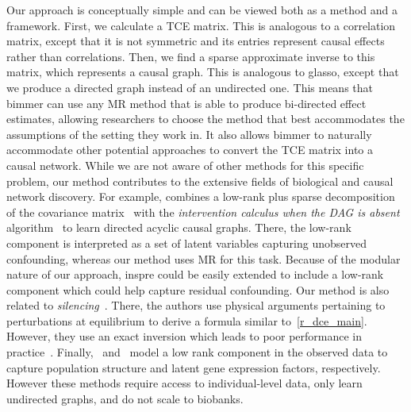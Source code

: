 \documentclass{article}
\begin{document}
Our approach is conceptually simple and can be viewed both as a method and a framework.
First, we calculate a TCE matrix.
This is analogous to a correlation matrix, except that it is not symmetric and its entries
represent causal effects rather than correlations. Then, we find a sparse approximate inverse
to this matrix, which represents a causal graph.
This is analogous to glasso, except that we produce a directed graph instead
of an undirected one. This means that bimmer can use any MR method
that is able to produce bi-directed effect estimates,
allowing researchers to choose the method that best accommodates the assumptions of
the setting they work in. It also allows bimmer to naturally accommodate other potential
approaches to convert the TCE matrix into a causal network.
While we are not aware of other methods for this specific problem, our method contributes to the
extensive fields of biological and causal network discovery.
For example, \cite{Frot2019a} combines a low-rank plus sparse decomposition
of the covariance matrix~\cite{Frot2019b,Chandrasekaran2012} with
the \emph{intervention calculus when the
DAG is absent} algorithm~\cite{Maathuis2009} to learn directed acyclic causal graphs. There, the low-rank
component is interpreted as a set of latent variables capturing unobserved confounding, whereas
our method uses MR for this task.
Because of the modular nature of our approach, inspre could be easily
extended to include a low-rank component which could help capture residual confounding.
Our method is also related to \emph{silencing}~\cite{Barzel2013}. There,
the authors use physical arguments pertaining to perturbations at equilibrium to derive
a formula similar to~\eqref{r_dce_main}. However, they use an exact inversion which
leads to poor performance in practice~\cite{Pachter}. Finally,~\cite{Dahl2013} and~\cite{Stegle2011}
model a low rank component in the observed data to capture population structure and latent
gene expression factors, respectively. However these methods require access to individual-level data,
only learn undirected graphs, and do not scale to biobanks.
\end{document}
